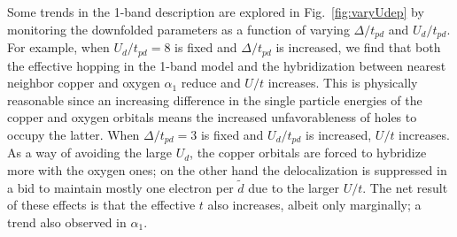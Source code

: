 Some trends in the 1-band description are explored in Fig.~\ref{fig:varyUdep} 
by monitoring the downfolded parameters as a function of varying $\Delta/t_{pd}$ and $U_d/t_{pd}$. 
For example, when $U_d/t_{pd}=8$ is fixed and $\Delta/t_{pd}$ is increased, we find that both 
the effective hopping in the 1-band model and the hybridization between nearest neighbor copper and oxygen $\alpha_1$ 
reduce and $U/t$ increases. This is physically reasonable since an increasing difference in the 
single particle energies of the copper and oxygen orbitals means the increased unfavorableness of holes 
to occupy the latter. When $\Delta/t_{pd}=3$ is fixed and $U_d/t_{pd}$ is increased, $U/t$ increases. 
As a way of avoiding the large $U_d$, the copper orbitals are forced to hybridize more with the oxygen ones; 
on the other hand the delocalization is suppressed in a bid to maintain mostly 
one electron per $\tilde{d}$ due to the larger $U/t$. 
The net result of these effects is that the effective $t$ also increases, albeit only marginally; a trend also observed in $\alpha_1$.

